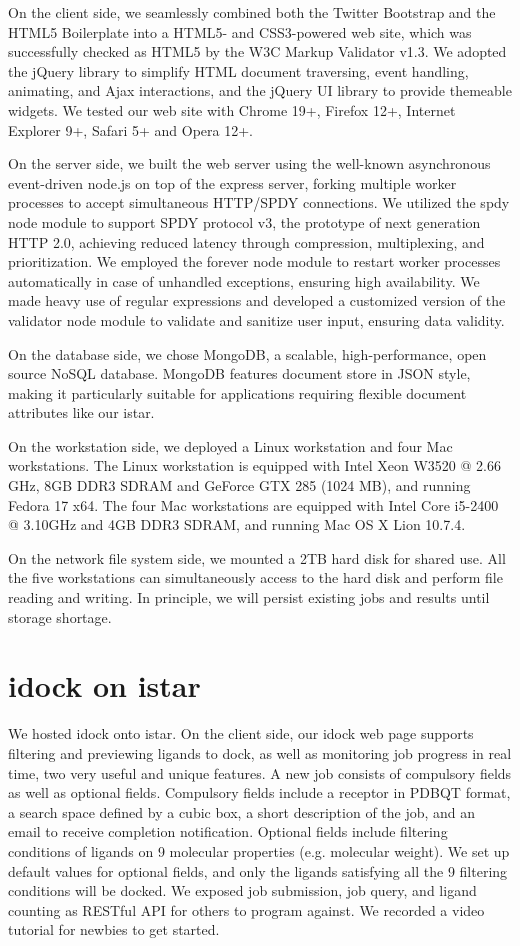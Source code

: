 \documentclass{bioinfo}
\begin{document}
On the client side, we seamlessly combined both the Twitter Bootstrap and the HTML5 Boilerplate into a HTML5- and CSS3-powered web site, which was successfully checked as HTML5 by the W3C Markup Validator v1.3. We adopted the jQuery library to simplify HTML document traversing, event handling, animating, and Ajax interactions, and the jQuery UI library to provide themeable widgets. We tested our web site with Chrome 19+, Firefox 12+, Internet Explorer 9+, Safari 5+ and Opera 12+.

On the server side, we built the web server using the well-known asynchronous event-driven node.js on top of the express server, forking multiple worker processes to accept simultaneous HTTP/SPDY connections. We utilized the spdy node module to support SPDY protocol v3, the prototype of next generation HTTP 2.0, achieving reduced latency through compression, multiplexing, and prioritization. We employed the forever node module to restart worker processes automatically in case of unhandled exceptions, ensuring high availability. We made heavy use of regular expressions and developed a customized version of the validator node module to validate and sanitize user input, ensuring data validity.

On the database side, we chose MongoDB, a scalable, high-performance, open source NoSQL database. MongoDB features document store in JSON style, making it particularly suitable for applications requiring flexible document attributes like our istar.

On the workstation side, we deployed a Linux workstation and four Mac workstations. The Linux workstation is equipped with Intel Xeon W3520 @ 2.66 GHz, 8GB DDR3 SDRAM and GeForce GTX 285 (1024 MB), and running Fedora 17 x64. The four Mac workstations are equipped with Intel Core i5-2400 @ 3.10GHz and 4GB DDR3 SDRAM, and running Mac OS X Lion 10.7.4.

On the network file system side, we mounted a 2TB hard disk for shared use. All the five workstations can simultaneously access to the hard disk and perform file reading and writing. In principle, we will persist existing jobs and results until storage shortage.

\section{idock on istar}

We hosted idock onto istar. On the client side, our idock web page supports filtering and previewing ligands to dock, as well as monitoring job progress in real time, two very useful and unique features. A new job consists of compulsory fields as well as optional fields. Compulsory fields include a receptor in PDBQT format, a search space defined by a cubic box, a short description of the job, and an email to receive completion notification. Optional fields include filtering conditions of ligands on 9 molecular properties (e.g. molecular weight). We set up default values for optional fields, and only the ligands satisfying all the 9 filtering conditions will be docked. We exposed job submission, job query, and ligand counting as RESTful API for others to program against. We recorded a video tutorial for newbies to get started.
\end{document}
